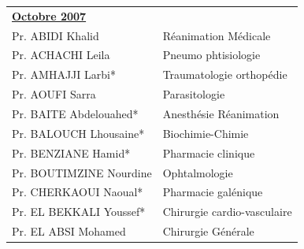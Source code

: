 

  \begin{table}[H]

    \begin{tabular}{l l}
     \multicolumn{2}{l}{\textbf{\underline{Octobre 2007}}}\vspace*{0.5em}\\
     Pr. ABIDI Khalid & \hspace*{2em} Réanimation Médicale\\
     Pr. ACHACHI Leila & \hspace*{2em} Pneumo phtisiologie\\
     Pr. AMHAJJI Larbi* & \hspace*{2em} Traumatologie orthopédie \\
     Pr. AOUFI Sarra	& \hspace*{2em} Parasitologie \\
     Pr. BAITE Abdelouahed* & \hspace*{2em} Anesthésie Réanimation \\
     Pr. BALOUCH Lhousaine* & \hspace*{2em} Biochimie-Chimie \\
     Pr. BENZIANE Hamid*	 &  \hspace*{2em} Pharmacie clinique\\
     Pr. BOUTIMZINE Nourdine &  \hspace*{2em} Ophtalmologie\\
     Pr. CHERKAOUI Naoual*	& \hspace*{2em} Pharmacie galénique\\
     Pr. EL BEKKALI Youssef* & \hspace*{2em} Chirurgie cardio-vasculaire \\
     Pr. EL ABSI Mohamed & \hspace*{2em} Chirurgie Générale\\
     

    \end{tabular}
    
    \end{table}

